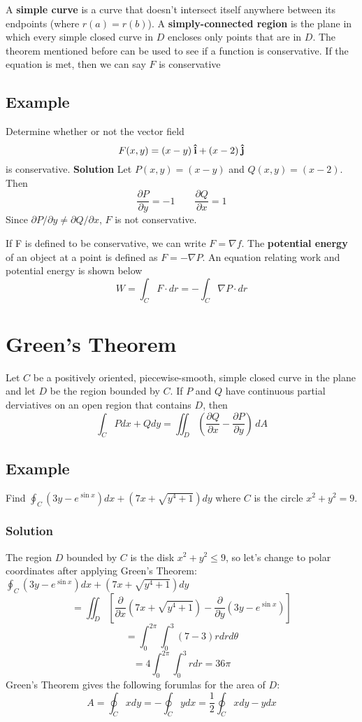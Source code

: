 A \textbf{simple curve} is a curve that doesn't intersect itself anywhere between its endpoints (where $r(a) = r(b)$). A \textbf{simply-connected region} is the plane in which every simple closed curve in $D$ encloses only points that are in $D$.
The theorem mentioned before can be used to see if a function is conservative. If the equation is met, then we can say $F$ is conservative 

\subsection*{Example}
Determine whether or not the vector field $$F(x,y) = (x - y)\:\boldsymbol{\hat{\textbf{i}}} + (x - 2)\:\boldsymbol{\hat{\textbf{j}}}$$ is conservative.
\textbf{Solution} Let $P(x,y) = (x-y)$ and $Q(x,y) = (x - 2)$. Then
$$\frac{\partial P}{\partial y} = -1\qquad \frac{\partial Q}{\partial x} = 1$$ Since $\partial P/\partial y\neq \partial Q/\partial x$, $F$ is not conservative.

If F is defined to be conservative, we can write $F = \nabla f$. The \textbf{potential energy} of an object at a point is defined as $F = -\nabla P$. An equation relating work and potential energy is shown below
$$W = \int_CF\cdot dr = -\int_C\nabla P\cdot dr$$

\section{Green's Theorem}
Let $C$ be a positively oriented, piecewise-smooth, simple closed curve in the plane and let $D$ be the region bounded by $C$. If $P$ and $Q$ have continuous partial derviatives on an open region that contains $D$, then 
$$\int_C P dx + Q dy = \iint_D \left(\frac{\partial Q}{\partial x} - \frac{\partial P}{\partial y}\right) \,dA$$
\subsection*{Example}
Find $\oint_C (3y-e^{\sin{x}}) dx + (7x  +\sqrt{y^4+1}) dy$ where $C$ is the circle $x^2 + y^2 = 9$.
\subsubsection*{Solution} The region $D$ bounded by $C$ is the disk $x^2 + y^2\leq 9$, so let's change to polar coordinates after applying Green's Theorem:
$\oint_C (3y-e^{\sin{x}}) dx + (7x  +\sqrt{y^4+1}) dy$ 
$$= \iint_D\left[\frac{\partial}{\partial x}(7x  +\sqrt{y^4+1}) - \frac{\partial}{\partial y}(3y-e^{\sin{x}})\right]$$
$$= \int^{2\pi}_0\int^3_0(7 - 3)rdrd\theta$$ $$= 4\int^{2\pi}_0\int^3_0rdr = 36\pi$$
Green's Theorem gives the following forumlas for the area of $D$:
$$A = \oint_Cx dy = -\oint_C y dx = \frac{1}{2}\oint_C x dy - y dx$$

